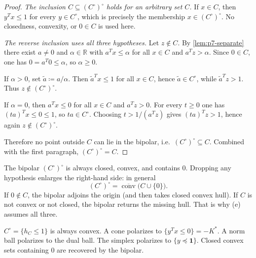 \documentclass[11pt,a4paper]{article}
\begin{document}
\begin{proof}
\emph{The inclusion \(C\subseteq(C^{\circ})^{\circ}\) holds for an arbitrary set \(C\).}
If \(x\in C\), then \(y^{T}x\le 1\) for every \(y\in C^{\circ}\), which is precisely the membership \(x\in(C^{\circ})^{\circ}\). No closedness, convexity, or \(0\in C\) is used here.

\emph{The reverse inclusion uses all three hypotheses.}
Let \(z\notin C\). By \cref{lem:p7-separate} there exist \(a\neq 0\) and \(\alpha\in\mathbb{R}\) with \(a^{T}x\le\alpha\) for all \(x\in C\) and \(a^{T}z>\alpha\). Since \(0\in C\), one has \(0=a^{T}0\le\alpha\), so \(\alpha\ge 0\).

If \(\alpha>0\), set \(\tilde{a}\coloneqq a/\alpha\). Then \(\tilde{a}^{T}x\le 1\) for all \(x\in C\), hence \(\tilde{a}\in C^{\circ}\), while \(\tilde{a}^{T}z>1\). Thus \(z\notin(C^{\circ})^{\circ}\).

If \(\alpha=0\), then \(a^{T}x\le 0\) for all \(x\in C\) and \(a^{T}z>0\). For every \(t\ge 0\) one has \((ta)^{T}x\le 0\le 1\), so \(ta\in C^{\circ}\). Choosing \(t>1/(a^{T}z)\) gives \((ta)^{T}z>1\), hence again \(z\notin(C^{\circ})^{\circ}\).

Therefore no point outside \(C\) can lie in the bipolar, i.e.\ \((C^{\circ})^{\circ}\subseteq C\). Combined with the first paragraph, \((C^{\circ})^{\circ}=C\).
\end{proof}

\begin{remark}
\label{rem:p7-bipolar}
The bipolar \((C^{\circ})^{\circ}\) is always closed, convex, and contains \(0\). Dropping any hypothesis enlarges the right-hand side: in general
\[
(C^{\circ})^{\circ}
=
\overline{\operatorname{conv}}\bigl(C\cup\{0\}\bigr).
\]
If \(0\notin C\), the bipolar adjoins the origin (and then takes closed convex hull). If \(C\) is not convex or not closed, the bipolar returns the missing hull. That is why (e) assumes all three.
\end{remark}

\begin{summary}[Problem 7]
\label{sum:p7}
\(C^{\circ}=\{h_{C}\le 1\}\) is always convex. A cone polarizes to \(\{y^{T}x\le 0\}=-K^{*}\). A norm ball polarizes to the dual ball. The simplex polarizes to \(\{y\preceq\mathbf{1}\}\). Closed convex sets containing \(0\) are recovered by the bipolar.
\end{summary}
\end{document}
